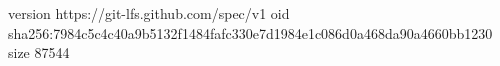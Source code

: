 version https://git-lfs.github.com/spec/v1
oid sha256:7984c5c4c40a9b5132f1484fafc330e7d1984e1c086d0a468da90a4660bb1230
size 87544
